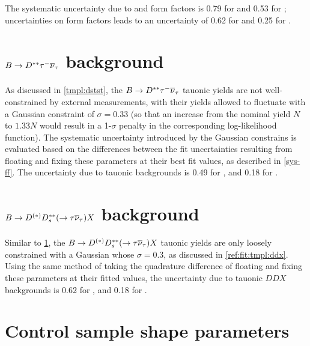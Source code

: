 
The systematic uncertainty due to \Dz and \Dstar form factors is 0.79 for
\RD and 0.53 for \RDst;
uncertainties on \Dstst form factors leads to an uncertainty of 0.62 for \RD and
0.25 for \RDst.


\section{$B \rightarrow D^{**}{\tau^-}{{\overline{\nu}}_\tau}$ background}
\label{sys-tau-dstst}

As discussed in \cref{tmpl:dstst},
the $B \rightarrow D^{**} {\tau^-}{{\overline{\nu}}_\tau}$ tauonic yields are not well-constrained
by external measurements,
with their yields allowed to fluctuate with a Gaussian constraint of
$\sigma = 0.33$
(so that an increase from the nominal yield $N$ to $1.33N$ would result in a
1-$\sigma$ penalty in the corresponding log-likelihood function).
The systematic uncertainty introduced by the Gaussian constrains
is evaluated based on the differences between the fit uncertainties resulting
from floating and fixing these parameters at their best fit values,
as described in \cref{sys-ff}.
The uncertainty due to tauonic \Dstst backgrounds is 0.49 for \RD,
and 0.18 for \RDst.


\section{$B \rightarrow D^{(*)} D^{**}_s (\rightarrow \tau{\ensuremath{{\overline{\nu}}_\tau}}) X$ background}
\label{sys-tau-ddx}

Similar to \cref{sys-tau-dstst},
the $B \rightarrow D^{(*)} D^{**}_s (\rightarrow \tau{\ensuremath{{\overline{\nu}}_\tau}}) X$ tauonic yields
are only loosely constrained with a Gaussian whose $\sigma = 0.3$,
as discussed in \cref{ref:fit:tmpl:ddx}.
Using the same method of taking the quadrature difference of floating and fixing
these parameters at their fitted values,
the uncertainty due to tauonic $DDX$ backgrounds is 0.62 for \RD,
and 0.18 for \RDst.



\section{Control sample shape parameters}
\label{sys-model-ctrl}

